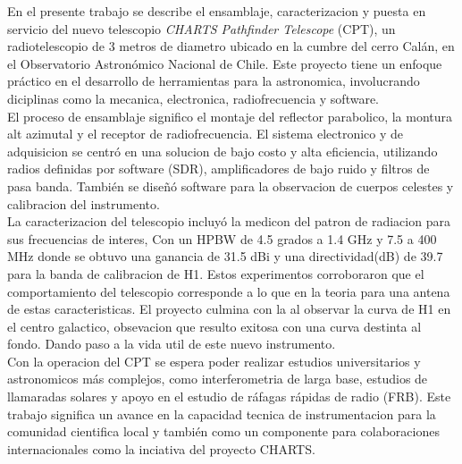 \documentclass[
	spanish, %
	letterpaper, oneside
]{book}
\begin{document}
\templatePortrait

\templatePagecfg

\begin{abstractd}
	En el presente trabajo se describe el ensamblaje, caracterizacion y puesta en servicio del nuevo telescopio \textit{CHARTS Pathfinder Telescope} (CPT), un radiotelescopio de 3 metros de diametro ubicado en la cumbre del cerro Calán, en el Observatorio Astronómico Nacional de Chile. Este proyecto tiene un enfoque práctico en el desarrollo de herramientas para la astronomica, involucrando diciplinas como la mecanica, electronica, radiofrecuencia y software.\\
	
	El proceso de ensamblaje significo el montaje del reflector parabolico, la montura alt azimutal y el receptor de radiofrecuencia. El sistema electronico y de adquisicion se centró en una solucion de bajo costo y alta eficiencia, utilizando radios definidas por software (SDR), amplificadores de bajo ruido y filtros de pasa banda. También se diseñó software para la observacion de cuerpos celestes y calibracion del instrumento.\\

	La caracterizacion del telescopio incluyó la medicon del patron de radiacion para sus frecuencias de interes, Con un HPBW de 4.5 grados a 1.4 GHz y 7.5 a 400 MHz donde se obtuvo una ganancia de 31.5 dBi y una directividad(dB) de 39.7 para la banda de calibracion de H1. Estos experimentos corroboraron que el comportamiento del telescopio corresponde a lo que en la teoria para una antena de estas caracteristicas. El proyecto culmina con la  al observar la curva de H1 en el centro galactico, obsevacion que resulto exitosa con una curva destinta al fondo. Dando paso a la vida util de este nuevo instrumento.\\

	Con la operacion del CPT se espera poder realizar estudios universitarios y astronomicos más complejos, como interferometria de larga base, estudios de llamaradas solares y apoyo  en el estudio de ráfagas rápidas de radio (FRB). Este trabajo significa un avance en la capacidad tecnica de instrumentacion para la comunidad cientifica local y también como un componente para colaboraciones internacionales como la inciativa del proyecto CHARTS. \\
\end{abstractd}
\end{document}
